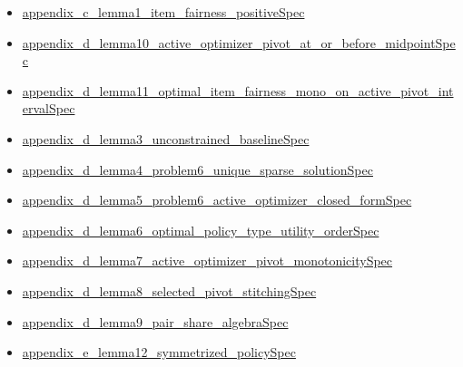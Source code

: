 \documentclass[10pt]{article}
\begin{document}
\begin{itemize}[leftmargin=1.2em]
\begin{itemize}[leftmargin=1.2em]
\item \hyperlink{source-claim-9c3a977985663e10}{appendix\_\allowbreak{}c\_\allowbreak{}lemma1\_\allowbreak{}item\_\allowbreak{}fairness\_\allowbreak{}positive\allowbreak{}Spec}
\item \hyperlink{source-claim-d461c27ad08b8393}{appendix\_\allowbreak{}d\_\allowbreak{}lemma10\_\allowbreak{}active\_\allowbreak{}optimizer\_\allowbreak{}pivot\_\allowbreak{}at\_\allowbreak{}or\_\allowbreak{}before\_\allowbreak{}midpoint\allowbreak{}Spec}
\item \hyperlink{source-claim-9a6a42e2321f37e9}{appendix\_\allowbreak{}d\_\allowbreak{}lemma11\_\allowbreak{}optimal\_\allowbreak{}item\_\allowbreak{}fairness\_\allowbreak{}mono\_\allowbreak{}on\_\allowbreak{}active\_\allowbreak{}pivot\_\allowbreak{}interval\allowbreak{}Spec}
\item \hyperlink{source-claim-2174fb755f649010}{appendix\_\allowbreak{}d\_\allowbreak{}lemma3\_\allowbreak{}unconstrained\_\allowbreak{}baseline\allowbreak{}Spec}
\item \hyperlink{source-claim-bdf6b6ab56cd5fdc}{appendix\_\allowbreak{}d\_\allowbreak{}lemma4\_\allowbreak{}problem6\_\allowbreak{}unique\_\allowbreak{}sparse\_\allowbreak{}solution\allowbreak{}Spec}
\item \hyperlink{source-claim-725d3169ac365914}{appendix\_\allowbreak{}d\_\allowbreak{}lemma5\_\allowbreak{}problem6\_\allowbreak{}active\_\allowbreak{}optimizer\_\allowbreak{}closed\_\allowbreak{}form\allowbreak{}Spec}
\item \hyperlink{source-claim-d98bc9bd5bb82720}{appendix\_\allowbreak{}d\_\allowbreak{}lemma6\_\allowbreak{}optimal\_\allowbreak{}policy\_\allowbreak{}type\_\allowbreak{}utility\_\allowbreak{}order\allowbreak{}Spec}
\item \hyperlink{source-claim-9c661bd3034e665b}{appendix\_\allowbreak{}d\_\allowbreak{}lemma7\_\allowbreak{}active\_\allowbreak{}optimizer\_\allowbreak{}pivot\_\allowbreak{}monotonicity\allowbreak{}Spec}
\item \hyperlink{source-claim-80513579ff0f392a}{appendix\_\allowbreak{}d\_\allowbreak{}lemma8\_\allowbreak{}selected\_\allowbreak{}pivot\_\allowbreak{}stitching\allowbreak{}Spec}
\item \hyperlink{source-claim-b15ee860ec553bb1}{appendix\_\allowbreak{}d\_\allowbreak{}lemma9\_\allowbreak{}pair\_\allowbreak{}share\_\allowbreak{}algebra\allowbreak{}Spec}
\item \hyperlink{source-claim-e72b5fec2071cbe5}{appendix\_\allowbreak{}e\_\allowbreak{}lemma12\_\allowbreak{}symmetrized\_\allowbreak{}policy\allowbreak{}Spec}

\end{itemize}
\end{itemize}
\end{document}
